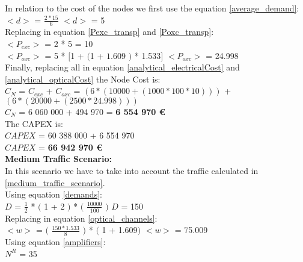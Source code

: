 In relation to the cost of the nodes we first use the equation \ref{average_demand}:\\

$<d>$ = $\frac{2 * 15}{6}$ \qquad \qquad $<d>$ = 5\\

Replacing in equation \ref{Pexc_transp} and \ref{Poxc_transp}:\\

$<P_{exc}>$ = 2 * 5 = 10\\

$<P_{oxc}>$ = 5 * $[$1 + $($1 + $1.609$ $)$ * 1.533$]$ \qquad \quad $<P_{oxc}>$ = 24.998 \\

Finally, replacing all in equation \ref{analytical_electricalCost} and \ref{analytical_opticalCost} the Node Cost is:\\

$C_N$ = $C_{exc}$ + $C_{oxc}$ = $\left( 6*(10 000 + (1 000 * 100 * 10 ) ) \right)$ + $\left(6*(20 000 + (2 500 * 24.998 ) ) \right)$\\

$C_N$ = 6 060 000 + 494 970 = \textbf{6 554 970 \euro}\\

The CAPEX is:\\
$CAPEX$ = 60 388 000 + 6 554 970\\

$CAPEX$ = \textbf{66 942 970 \euro}\\


\textbf{Medium Traffic Scenario:}\\
In this scenario we have to take into account the traffic calculated in \ref{medium_traffic_scenario}.\\

Using equation \ref{demands}:\\

$D$ = $\frac{1}{2}$ * $($ 1 + 2 $)$ * $($ $\frac{10000}{100}$ $)$ \qquad \qquad $D$ = 150\\

Replacing in equation \ref{optical_channels}:\\

$<w>$ = $($ $\frac{150 * 1.533}{8}$ $)$ * $($ 1 + 1.609$)$ \qquad \qquad $<w>$ = 75.009\\

Using equation \ref{amplifiers}:\\

$N^R$ = 35\\


